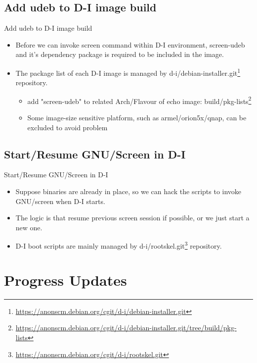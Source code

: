\documentclass{beamer}				%
\begin{document}
\subsection{Add udeb to D-I image build}
\begin{frame}{Add udeb to D-I image build}
  \begin{itemize}
  \item Before we can invoke screen command within D-I environment, screen-udeb and it's dependency package is required to be included in the image.
  \item The package list of each D-I image is managed by d-i/debian-installer.git\footnote{\url{https://anonscm.debian.org/cgit/d-i/debian-installer.git}} repository.
    \begin{itemize}
	\item add "screen-udeb" to related Arch/Flavour of echo image: build/pkg-lists\footnote{\tiny\url{https://anonscm.debian.org/cgit/d-i/debian-installer.git/tree/build/pkg-lists}}
    \item Some image-size sensitive platform, such as armel/orion5x/qnap, can be excluded to avoid problem
    \end{itemize}
  \end{itemize}
\end{frame}

\subsection{Start/Resume GNU/Screen in D-I}
\begin{frame}{Start/Resume GNU/Screen in D-I}
  \begin{itemize}
  \item Suppose binaries are already in place, so we can hack the scripts to invoke GNU/screen when D-I starts.
  \item The logic is that resume previous screen session if possible, or we just start a new one.
  \item D-I boot scripts are mainly managed by d-i/rootskel.git\footnote{\url{https://anonscm.debian.org/cgit/d-i/rootskel.git}} repository.
  \end{itemize}
\end{frame}


\section{Progress Updates}
\end{document}
